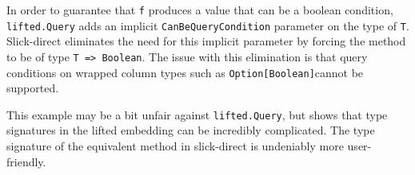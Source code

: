 
In order to guarantee that \texttt{f} produces a value that can be a boolean condition, \texttt{lifted.Query} adds an implicit \texttt{CanBeQueryCondition} parameter on the type of \texttt{T}.
Slick-direct eliminates the need for this implicit parameter by forcing the method to be of type \texttt{T => Boolean}.
The issue with this elimination is that query conditions on wrapped column types such as \texttt{Option[Boolean]}cannot be supported.


This example may be a bit unfair against \texttt{lifted.Query}, but shows that type signatures in the lifted embedding can be incredibly complicated.
The type signature of the equivalent method in slick-direct is undeniably more user-friendly.

